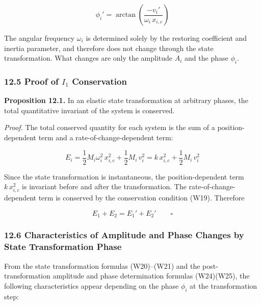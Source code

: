 \documentclass[a4paper,11pt]{article}
\begin{document}
\[\phi_i' = \arctan\!\left(\frac{-v_i'}{\omega_i\, x_{i,c}}\right) \tag{W25}\]

The angular frequency \(\omega_i\) is determined solely by the restoring
coefficient and inertia parameter, and therefore does not change through
the state transformation. What changes are only the amplitude \(A_i\)
and the phase \(\phi_i\).

\subsubsection{\texorpdfstring{12.5 Proof of \(I_1\)
Conservation}{12.5 Proof of I\_1 Conservation}}\label{proof-of-i_1-conservation}

\textbf{Proposition 12.1.} In an elastic state transformation at
arbitrary phases, the total quantitative invariant of the system is
conserved.

\emph{Proof.} The total conserved quantity for each system is the sum of
a position-dependent term and a rate-of-change-dependent term:

\[E_i = \frac{1}{2}M_i\omega_i^2\,x_{i,c}^2 + \frac{1}{2}M_i\,v_i^2 = k\,x_{i,c}^2 + \frac{1}{2}M_i\,v_i^2\]

Since the state transformation is instantaneous, the position-dependent
term \(k\,x_{i,c}^2\) is invariant before and after the transformation.
The rate-of-change-dependent term is conserved by the conservation
condition (W19). Therefore

\[E_1 + E_2 = E_1' + E_2' \qquad \square \tag{W26}\]

\subsubsection{12.6 Characteristics of Amplitude and Phase Changes by
State Transformation
Phase}\label{characteristics-of-amplitude-and-phase-changes-by-state-transformation-phase}

From the state transformation formulas (W20)--(W21) and the
post-transformation amplitude and phase determination formulas
(W24)(W25), the following characteristics appear depending on the phase
\(\phi_i\) at the transformation step:
\end{document}
